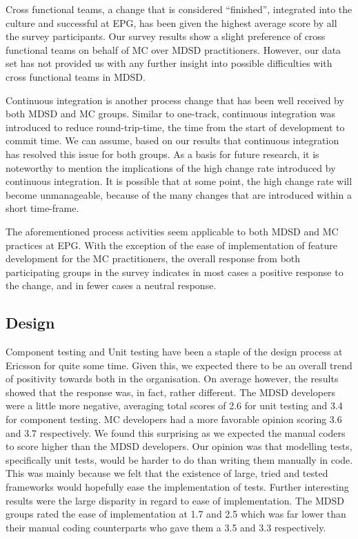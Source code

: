 \documentclass[final_report_innit.tex]{subfiles}
\begin{document}
Cross functional teams, a change that is considered ``finished'', integrated into the culture and successful at EPG, has been given the highest average score by all the survey participants. Our survey results show a slight preference of cross functional teams on behalf of MC over MDSD practitioners. However, our data set has not provided us with any further insight into possible difficulties with cross functional teams in MDSD. 

Continuous integration is another process change that has been well received by both MDSD and MC groups. Similar to one-track, continuous integration was introduced to reduce round-trip-time, the time from the start of development to commit time. We can assume, based on our results that continuous integration has resolved this issue for both groups. As a basis for future research, it is noteworthy to mention the implications of the high change rate introduced by continuous integration. It is possible that at some point, the high change rate will become unmanageable, because of the many changes that are introduced within a short time-frame.

The aforementioned process activities seem applicable to both MDSD and MC practices at EPG. With the exception of the ease of implementation of feature development for the MC practitioners, the overall response from both participating groups in the survey indicates in most cases a positive response to the change, and in fewer cases a neutral response.

\subsection*{Design}

Component testing and Unit testing have been a staple of the design process at Ericsson for quite some time. Given this, we expected there to be an overall trend of positivity towards both in the organisation. On average however, the results showed that the response was, in fact, rather different. The MDSD developers were a little more negative, averaging total scores of 2.6 for unit testing and 3.4 for component testing. MC developers had a more favorable opinion scoring 3.6 and 3.7 respectively. We found this surprising as we expected the manual coders to score higher than the MDSD developers. Our opinion was that modelling tests, specifically unit tests, would be harder to do than writing them manually in code. This was mainly because we felt that the existence of large, tried and tested frameworks would hopefully ease the implementation of tests. Further interesting results were the large disparity in regard to ease of implementation. The MDSD groups rated the ease of implementation at 1.7 and 2.5 which was far lower than their manual coding counterparts who gave them a 3.5 and 3.3 respectively.
\end{document}
